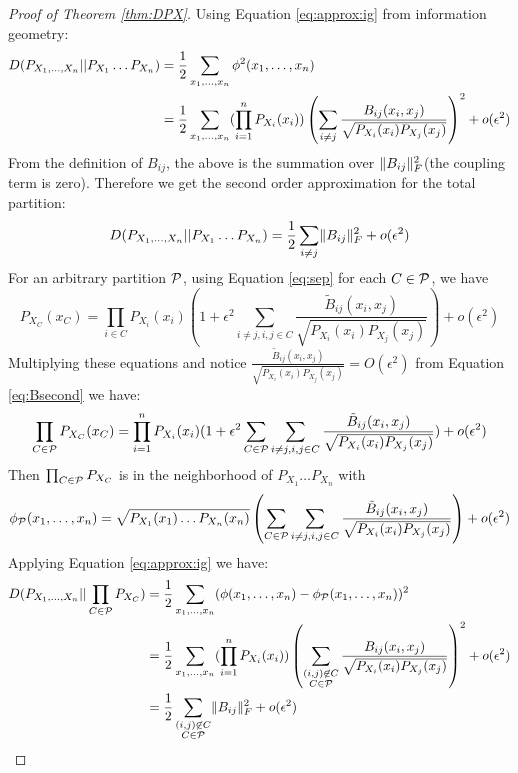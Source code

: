 \begin{proof}[Proof of Theorem \ref{thm:DPX}]
Using Equation \eqref{eq:approx:ig} from information geometry:
\begin{align*}
D(P_{X_1,\dots, X_n}|| P_{X_1}\dots P_{X_n}) & ={1 \over 2} \sum_{x_1,\dots,x_n}\phi^2(x_1,\dots, x_n) \\
& = {1\over 2}\sum_{x_1,\dots,x_n} (\prod_{i=1}^n  P_{X_i} (x_i)) \left(\sum_{i\neq j}{B_{ij}(x_i, x_j) \over \sqrt{P_{X_i}(x_i)P_{X_j}(x_j)} }\right)^2 +o(\epsilon^2) 
\end{align*}
From the definition of $B_{ij}$, the above is the summation over $\norm{B_{ij}}^2_F$(the coupling term is zero).
Therefore we get the second order approximation for the total partition:
\begin{equation}
D(P_{X_1,\dots, X_n}|| P_{X_1}\dots P_{X_n}) =   {1 \over 2} \sum_{i\neq j} \norm{B_{ij}}^2_F + o(\epsilon^2)
\end{equation}
For an arbitrary partition $\P$, using Equation \eqref{eq:sep} for each $C\in \P$, we have
\begin{equation}
P_{X_C}(x_C) = \prod_{i\in C} P_{X_i}(x_i)(1 + \epsilon^2 \sum_{i\neq j,i,j\in C} \frac{\tilde{B}_{ij}(x_i, x_j)}{\sqrt{P_{X_i}(x_i)P_{X_j}(x_j)}}) + o(\epsilon^2)
\end{equation}
Multiplying these equations and notice $\frac{\tilde{B}_{ij}(x_i, x_j)}{\sqrt{P_{X_i}(x_i)P_{X_j}(x_j)}}=O(\epsilon^2)$ from
Equation \eqref{eq:Bsecond} we have:
\begin{equation}
\prod_{C\in \P}P_{X_C}(x_C) = \prod_{i=1}^n P_{X_i}(x_i)(1+\epsilon^2 \sum_{C\in\P}\sum_{i\neq j,i,j\in C}\frac{\tilde{B}_{ij}(x_i, x_j)}{\sqrt{P_{X_i}(x_i)P_{X_j}(x_j)}}) + o(\epsilon^2)
\end{equation}
Then $\prod_{C\in \P}P_{X_C}$ is in the neighborhood of $P_{X_1}\dots P_{X_n}$ with $$\phi_{\P}(x_1,\dots, x_n)=
\sqrt{P_{X_1}(x_1)\dots P_{X_n}(x_n)}\left(\sum_{C\in\P}\sum_{i\neq j,i,j\in C}\frac{\tilde{B}_{ij}(x_i, x_j)}{\sqrt{P_{X_i}(x_i)P_{X_j}(x_j)}}\right)+o(\epsilon^2)$$
Applying Equation  \eqref{eq:approx:ig} we have:
\begin{align*}
D(P_{X_1,\dots, X_n}|| \prod_{C\in \P}P_{X_C}) & ={1 \over 2} \sum_{x_1,\dots,x_n}(\phi(x_1,\dots, x_n)-\phi_{\P}(x_1, \dots, x_n))^2 \\
& = {1\over 2}\sum_{x_1,\dots,x_n} (\prod_{i=1}^n  P_{X_i} (x_i)) \left(\sum_{\substack{(i,j) \not\in C\\ C\in \P}} {B_{ij}(x_i, x_j) \over \sqrt{P_{X_i}(x_i)P_{X_j}(x_j)} }\right)^2 +o(\epsilon^2) \\
& = \frac{1}{2} \sum_{\substack{(i,j) \not\in C\\ C\in \P}} \norm{B_{ij}}_F^2 + o(\epsilon^2)
\end{align*}
\end{proof}
